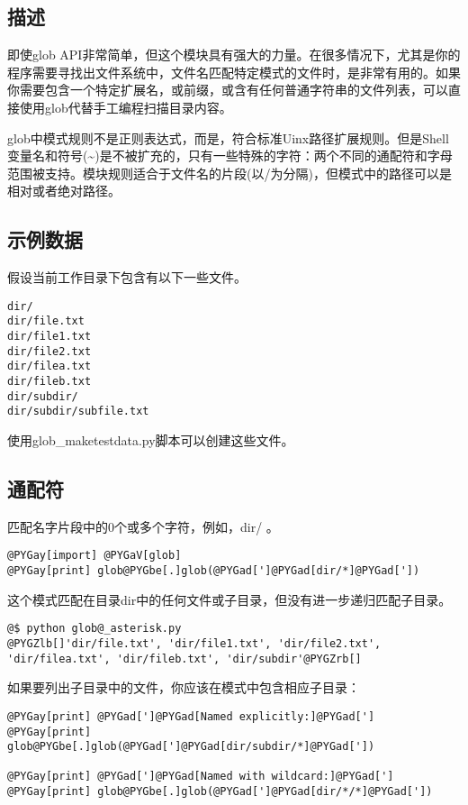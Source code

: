 \documentclass[a4paper,10pt,english]{manual}
\begin{document}
\subsection{描述}

即使glob API非常简单，但这个模块具有强大的力量。在很多情况下，尤其是你的程序需要寻找出文件系统中，文件名匹配特定模式的文件时，是非常有用的。如果你需要包含一个特定扩展名，或前缀，或含有任何普通字符串的文件列表，可以直接使用glob代替手工编程扫描目录内容。

glob中模式规则不是正则表达式，而是，符合标准Uinx路径扩展规则。但是Shell变量名和符号(\textasciitilde{})是不被扩充的，只有一些特殊的字符：两个不同的通配符和字母范围被支持。模块规则适合于文件名的片段(以/为分隔)，但模式中的路径可以是相对或者绝对路径。


\subsection{示例数据}

假设当前工作目录下包含有以下一些文件。

\begin{Verbatim}[commandchars=@\[\]]
dir/
dir/file.txt
dir/file1.txt
dir/file2.txt
dir/filea.txt
dir/fileb.txt
dir/subdir/
dir/subdir/subfile.txt
\end{Verbatim}

使用glob\_maketestdata.py脚本可以创建这些文件。


\subsection{通配符}

\code{*} 匹配名字片段中的0个或多个字符，例如，dir/\code{*} 。

\begin{Verbatim}[commandchars=@\[\]]
@PYGay[import] @PYGaV[glob]
@PYGay[print] glob@PYGbe[.]glob(@PYGad[']@PYGad[dir/*]@PYGad['])
\end{Verbatim}

这个模式匹配在目录dir中的任何文件或子目录，但没有进一步递归匹配子目录。

\begin{Verbatim}[commandchars=@\[\]]
@$ python glob@_asterisk.py
@PYGZlb[]'dir/file.txt', 'dir/file1.txt', 'dir/file2.txt',
'dir/filea.txt', 'dir/fileb.txt', 'dir/subdir'@PYGZrb[]
\end{Verbatim}

如果要列出子目录中的文件，你应该在模式中包含相应子目录：

\begin{Verbatim}[commandchars=@\[\]]
@PYGay[print] @PYGad[']@PYGad[Named explicitly:]@PYGad[']
@PYGay[print] glob@PYGbe[.]glob(@PYGad[']@PYGad[dir/subdir/*]@PYGad['])

@PYGay[print] @PYGad[']@PYGad[Named with wildcard:]@PYGad[']
@PYGay[print] glob@PYGbe[.]glob(@PYGad[']@PYGad[dir/*/*]@PYGad['])
\end{Verbatim}
\end{document}
